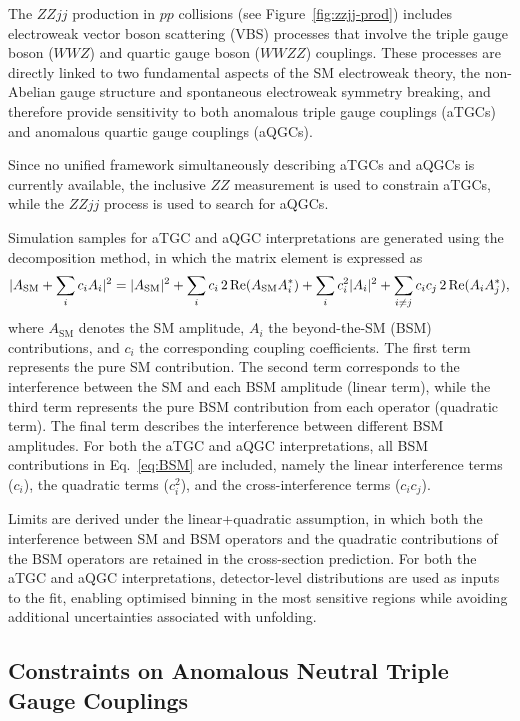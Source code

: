The $ZZjj$ production in $pp$ collisions (see Figure~\ref{fig:zzjj-prod}) includes electroweak vector boson scattering (VBS) processes that involve the triple gauge boson ($WWZ$) and quartic gauge boson ($WWZZ$) couplings. These processes are directly linked to two fundamental aspects of the SM electroweak theory, the non-Abelian gauge structure and spontaneous electroweak symmetry breaking, and therefore provide sensitivity to both anomalous triple gauge couplings (aTGCs) and anomalous quartic gauge couplings (aQGCs).

Since no unified framework simultaneously describing aTGCs and aQGCs is currently available, the inclusive $ZZ$ measurement is used to constrain aTGCs, while the $ZZjj$ process is used to search for aQGCs.

Simulation samples for aTGC and aQGC interpretations are generated using the decomposition method, in which the matrix element is expressed as
\begin{equation}
\small
    |A_{\text{SM}} + \sum_i c_i A_i|^2
    = |A_{\text{SM}}|^2
    + \sum_i c_i\, 2\, \mathrm{Re}(A_{\text{SM}} A_i^*)
    + \sum_i c_i^2 |A_i|^2
    + \sum_{i \ne j} c_i c_j\, 2\, \mathrm{Re}(A_i A_j^*),
\end{equation}\label{eq:BSM}
where $A_{\text{SM}}$ denotes the SM amplitude, $A_i$ the beyond-the-SM (BSM) contributions, and $c_i$ the corresponding coupling coefficients. 
The first term represents the pure SM contribution. The second term corresponds to the interference between the SM and each BSM amplitude (linear term), while the third term represents the pure BSM contribution from each operator (quadratic term). The final term describes the interference between different BSM amplitudes. For both the aTGC and aQGC interpretations, all BSM contributions in Eq.~\ref{eq:BSM} are included, namely the linear interference terms ($c_i$), the quadratic terms ($c_i^2$), and the cross-interference terms ($c_i c_j$).

Limits are derived under the linear+quadratic assumption, in which both the interference between SM and BSM operators and the quadratic contributions of the BSM operators are retained in the cross-section prediction. For both the aTGC and aQGC interpretations, detector-level distributions are used as inputs to the fit, enabling optimised binning in the most sensitive regions while avoiding additional uncertainties associated with unfolding.

\subsection{Constraints on Anomalous Neutral Triple Gauge Couplings}
\label{sec:aTGC}

